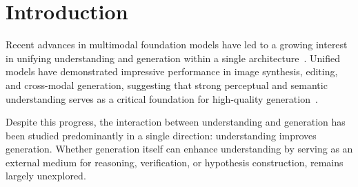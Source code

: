 \documentclass{article}
\theoremstyle{plain}
\theoremstyle{definition}
\theoremstyle{remark}
\begin{document}
    


\section{Introduction}

Recent advances in multimodal foundation models have led to a growing interest in unifying understanding and generation within a single architecture~\cite{yang2025survey}. Unified models have demonstrated impressive performance in image synthesis, editing, and cross-modal generation, suggesting that strong perceptual and semantic understanding serves as a critical foundation for high-quality generation~\cite{zou2025unimmmu,xie2025mmeunify,li2025unieval,tri_marf_2026}.

Despite this progress, the interaction between understanding and generation has been studied predominantly in a single direction: understanding improves generation. Whether generation itself can enhance understanding by serving as an external medium for reasoning, verification, or hypothesis construction, remains largely unexplored. 
\end{document}
